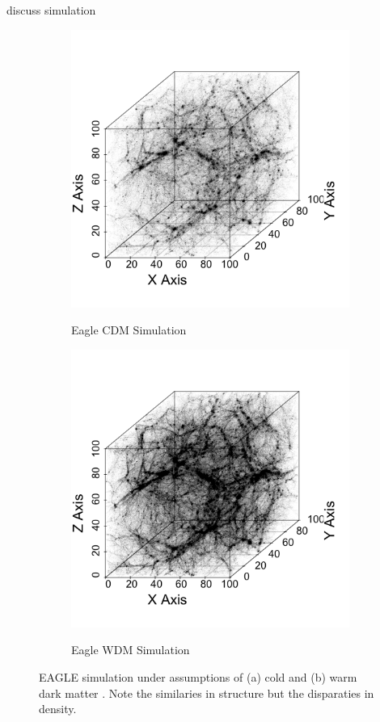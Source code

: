 \documentclass[12pt]{article}
\begin{document}
{\color{red} discuss simulation}
\begin{figure}[htp!]
  \centering
  \begin{subfigure}{.3\textwidth}
    \centering
    \caption{Eagle CDM Simulation}  \includegraphics[width=\linewidth]{figure_1_whole_wdm.png}
    \label{fig:introDataCDM}
  \end{subfigure}
    \begin{subfigure}{.3\textwidth}
    \centering
    \caption{Eagle WDM Simulation}  \includegraphics[width=\linewidth]{figure_1_whole_cdm.png}
    \label{fig:introDataWDM}
  \end{subfigure}
    \caption{EAGLE simulation under assumptions of (a) cold and (b) warm dark matter \citep{schaye2015eagle}. Note the similaries in structure but the disparaties in density. }
    \label{fig:introData}
\end{figure}
\end{document}
